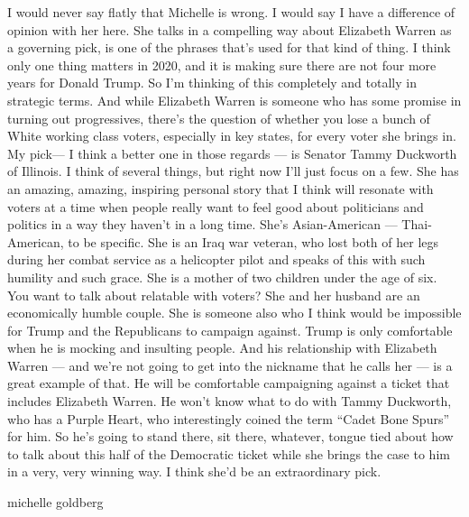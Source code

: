 I would never say flatly that Michelle is wrong. I would say I have a
difference of opinion with her here. She talks in a compelling way about
Elizabeth Warren as a governing pick, is one of the phrases that's used
for that kind of thing. I think only one thing matters in 2020, and it
is making sure there are not four more years for Donald Trump. So I'm
thinking of this completely and totally in strategic terms. And while
Elizabeth Warren is someone who has some promise in turning out
progressives, there's the question of whether you lose a bunch of White
working class voters, especially in key states, for every voter she
brings in. My pick--- I think a better one in those regards --- is
Senator Tammy Duckworth of Illinois. I think of several things, but
right now I'll just focus on a few. She has an amazing, amazing,
inspiring personal story that I think will resonate with voters at a
time when people really want to feel good about politicians and politics
in a way they haven't in a long time. She's Asian-American ---
Thai-American, to be specific. She is an Iraq war veteran, who lost both
of her legs during her combat service as a helicopter pilot and speaks
of this with such humility and such grace. She is a mother of two
children under the age of six. You want to talk about relatable with
voters? She and her husband are an economically humble couple. She is
someone also who I think would be impossible for Trump and the
Republicans to campaign against. Trump is only comfortable when he is
mocking and insulting people. And his relationship with Elizabeth Warren
--- and we're not going to get into the nickname that he calls her ---
is a great example of that. He will be comfortable campaigning against a
ticket that includes Elizabeth Warren. He won't know what to do with
Tammy Duckworth, who has a Purple Heart, who interestingly coined the
term ``Cadet Bone Spurs'' for him. So he's going to stand there, sit
there, whatever, tongue tied about how to talk about this half of the
Democratic ticket while she brings the case to him in a very, very
winning way. I think she'd be an extraordinary pick.

michelle goldberg

